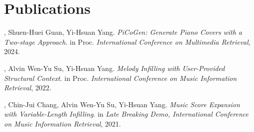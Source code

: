 
\section{Publications}
\begin{thebibliography}{1}
    , Shuen-Huei Guan, Yi-Hsuan Yang.
    \newblock \emph{PiCoGen: Generate Piano Covers with a Two-stage Approach}.
    \newblock in Proc. \emph{International Conference on Multimedia Retrieval}, 2024.

    , Alvin Wen-Yu Su, Yi-Hsuan Yang.
    \newblock \emph{Melody Infilling with User-Provided Structural Context}.
    \newblock in Proc. \emph{International Conference on Music Information Retrieval}, 2022.

    , Chin-Jui Chang, Alvin Wen-Yu Su, Yi-Hsuan Yang.
    \newblock \emph{Music Score Expansion with Variable-Length Infilling}.
    \newblock in \emph{Late Breaking Demo, International Conference on Music Information Retrieval}, 2021.

\end{thebibliography}


%
%


